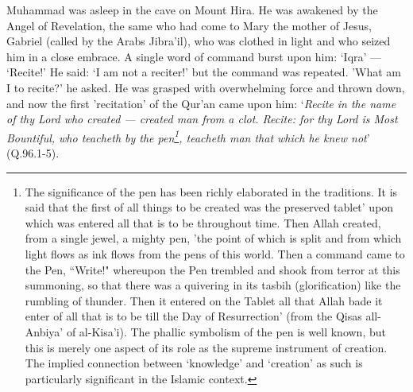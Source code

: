 \documentclass[10pt, twoside]{book}
\begin{document}
Muhammad was asleep in the cave on Mount Hira. He was awakened by the Angel of Revelation, the same who had come to Mary the mother of Jesus, Gabriel (called by the Arabs Jibra'il), who was clothed in light and who seized him in a close embrace. A single word of command burst upon him: `Iqra' --- 
`Recite!' He said: `I am not a reciter!' but the command was repeated. 'What am I to recite?' he 
asked. He was grasped with overwhelming force and thrown down, and now the first 'recitation' of the 
Qur'an came upon him: `\emph{Recite in the name of thy Lord who created --- created man from a clot. Recite: for thy Lord is Most Bountiful, who teacheth by the pen\footnote{The significance of the pen has been richly elaborated in the traditions. It is said that the first of all things to be created was the preserved tablet' upon which was entered all that is to be throughout time. Then Allah created, from a single jewel, a mighty pen, 'the point of which is split and from which light flows as ink flows from the pens of this world. Then a command came to the Pen, ``Write!" whereupon the Pen trembled and shook from terror at this summoning, so that there was a quivering in its tasbih (glorification) like the rumbling of thunder. Then it entered on the Tablet all that Allah bade it enter of all that is to be till the Day of Resurrection' (from the Qisas all\hyp{}Anbiya' of al\hyp{}Kisa'i). The phallic symbolism of the pen is well known, but this is merely one aspect of its role as the supreme instrument of creation. The implied connection between `knowledge' and `creation' as such is particularly significant in the Islamic context.}, teacheth man that which he knew 
not}' (Q.96.1-5). \\
\end{document}
